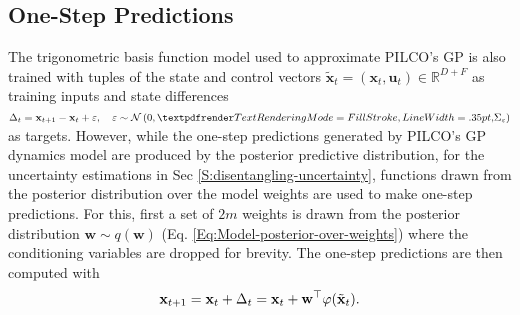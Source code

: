\subsection{One-Step Predictions}
\label{S:one-step-predictions}
The trigonometric basis function model used to approximate PILCO's GP is also trained with tuples of the state and control vectors $\tilde{\mathbf{x}}_{t}=\left(\mathbf{x}_{t}, \mathbf{u}_{t}\right)\in \mathbb{R}^{D+F}$ as training inputs and state differences $\Delta_{t}=\mathbf{x}_{t+1}-\mathbf{x}_{t}+\varepsilon,\quad \varepsilon \sim \mathcal{N}\left(0, \boldgreek{\Sigma}_{\varepsilon}\right)$ as targets. However, while the one-step predictions generated by PILCO's GP dynamics model are produced by the posterior predictive distribution, for the uncertainty estimations in Sec \ref{S:disentangling-uncertainty}, functions drawn from the posterior distribution over the model weights are used to make one-step predictions. For this, first a set of $2m$ weights is drawn from the posterior distribution $\mathbf{w} \sim q(\mathbf{w})$ (Eq. \ref{Eq:Model-posterior-over-weights}) where the conditioning variables are dropped for brevity. The one-step predictions are then computed with
\begin{equation}
    \mathbf{x}_{t+1}
    = \mathbf{x}_{t} + \Delta_{t} \\
    =\mathbf{x}_{t}+\mathbf{w}^{\top}\varphi(\tilde{\mathbf{x}}_{t}).
    \label{Eq:model-posterior-one-step}
\end{equation}


